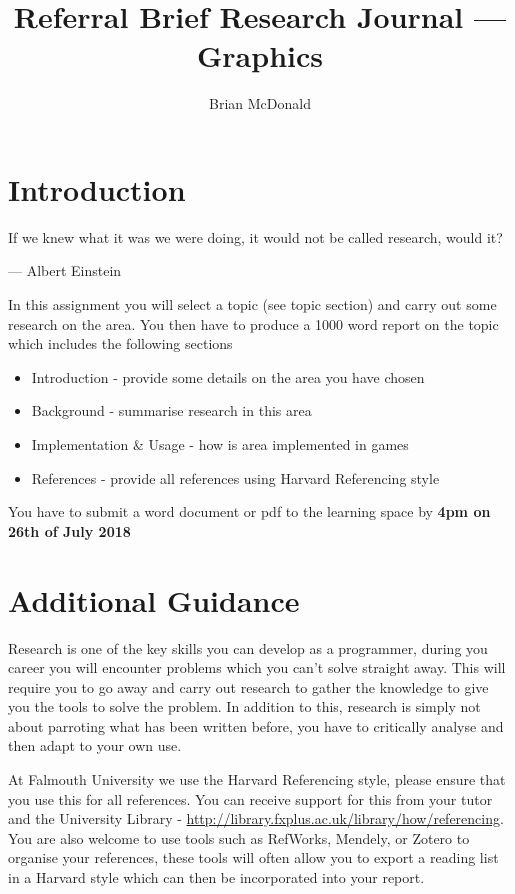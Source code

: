 \documentclass{../../fal_assignment}
\title{Referral Brief Research Journal --- Graphics}
\author{Brian McDonald}
\begin{document}
	
	\maketitle
	
	\section*{Introduction}
	
	\begin{marginquote}
		If we knew what it was we were doing, it would not be called research, would it?
		
		--- Albert Einstein
		
	\end{marginquote}
	
	In this assignment you will select a topic (see topic section) and carry out some research on the area. You then have to produce a 1000 word report on the topic which includes the following sections
	
	\begin{itemize}
		\item Introduction - provide some details on the area you have chosen
		\item Background - summarise research in this area
		\item Implementation \& Usage - how is area implemented in games
		\item References - provide all references using Harvard Referencing style 
	\end{itemize}
	
	You have to submit a word document or pdf to the learning space by \textbf{4pm on 26th of July 2018}
	
	\section*{Additional Guidance}
	Research is one of the key skills you can develop as a programmer, during you career you will encounter problems which you can't solve straight away. This will require you to go away and carry out research to gather the knowledge to give you the tools to solve the problem. In addition to this, research is simply not about parroting what has been written before, you have to critically analyse and then adapt to your own use.
	
	At Falmouth University we use the Harvard Referencing style, please ensure that you use this  for all references. You can receive support for this from your tutor and the University Library - \url{http://library.fxplus.ac.uk/library/how/referencing}. You are also welcome to use tools such as RefWorks, Mendely, or Zotero to organise your references, these tools will often allow you to export a reading list in a Harvard style which can then be incorporated into your report.
	
\end{document}
